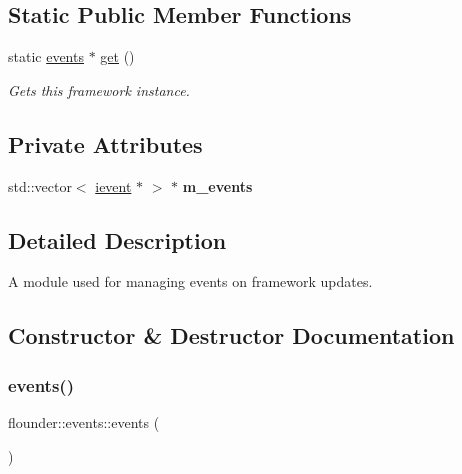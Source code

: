\subsection*{Static Public Member Functions}
\begin{DoxyCompactItemize}
\item 
static \hyperlink{classflounder_1_1events}{events} $\ast$ \hyperlink{classflounder_1_1events_aba09dc039ab9ddb860932a3f8d964f1e}{get} ()
\begin{DoxyCompactList}\small\item\em Gets this framework instance. \end{DoxyCompactList}\end{DoxyCompactItemize}
\subsection*{Private Attributes}
\begin{DoxyCompactItemize}
\item 
\mbox{\label{classflounder_1_1events_ad6bb57d0e1858c5426cf9f466abc7253}} 
std\+::vector$<$ \hyperlink{classflounder_1_1ievent}{ievent} $\ast$ $>$ $\ast$ {\bfseries m\+\_\+events}
\end{DoxyCompactItemize}


\subsection{Detailed Description}
A module used for managing events on framework updates. 



\subsection{Constructor \& Destructor Documentation}
\mbox{\label{classflounder_1_1events_ae354f15876d95e28706b1d96dcd790af}} 
\subsubsection{\texorpdfstring{events()}{events()}}
{\footnotesize\ttfamily flounder\+::events\+::events (\begin{DoxyParamCaption}{ }\end{DoxyParamCaption})}



